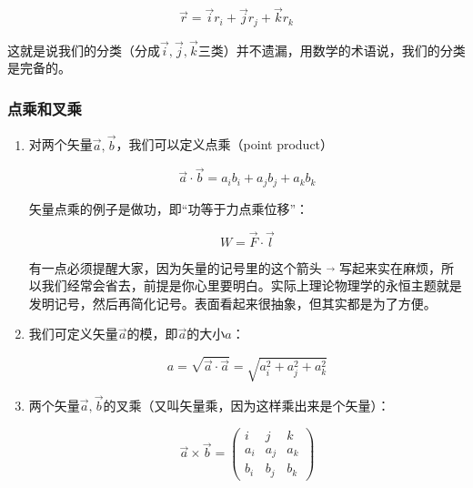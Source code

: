 \begin{equation}
\vec r =  \vec i  r_i +  \vec j  r_j +  \vec k  r_k 
\end{equation}

这就是说我们的分类（分成$\vec i , \vec j , \vec k$三类）并不遗漏，用数学的术语说，我们的分类是完备的。

\subsubsection{点乘和叉乘}

\begin{enumerate}

\item 

对两个矢量$\vec a, \vec b$，我们可以定义点乘（point product）

\begin{equation}
\vec a \cdot \vec b = a_i b_i + a_j b_j + a_k b_k
\end{equation}

矢量点乘的例子是做功，即“功等于力点乘位移”：

\begin{equation}
W = \vec F \cdot \vec l
\end{equation}

有一点必须提醒大家，因为矢量的记号里的这个箭头 \quad  $\vec {}$ \quad 写起来实在麻烦，所以我们经常会省去，前提是你心里要明白。实际上理论物理学的永恒主题就是发明记号，然后再简化记号。表面看起来很抽象，但其实都是为了方便。

\item

我们可定义矢量$\vec a$的模，即$\vec a$的大小$a$：

\begin{equation}
a = \sqrt{ \vec a \cdot \vec a } = \sqrt{ a_i^2 + a_j^2 + a_k^2 }
\end{equation}

\item

两个矢量$\vec a, \vec b$的叉乘（又叫矢量乘，因为这样乘出来是个矢量）：

\begin{equation}
\vec a \times \vec b = 
\left(  
\begin{array} {lcr}
i & j & k \\
a_i & a_j & a_k \\
b_i & b_j & b_k 
\end{array}
\right)
\end{equation}

\end{enumerate}

